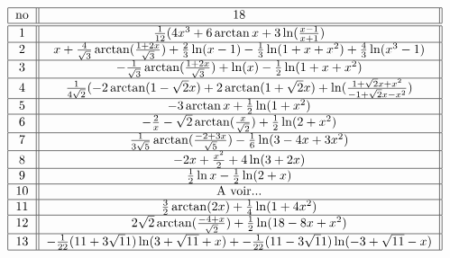  
\[ \begin{tabular}{| c || c ||  }
\hline       no &         ${ 18}                                          $                                                                                                               \\    \hline \hline
             $1$   & $\frac{1}{12}(4x^3+6\arctan x +3\ln(\frac{x-1}{x+1})      $            \\ \hline 
            $2$   &  $ x+\frac{4}{\sqrt 3}\arctan(\frac{1+2x}{\sqrt 3})+ \frac{2}{3}\ln(x-1)- \frac{1}{3}\ln(1+x+x^2) +\frac{4}{3}\ln(x^3-1)$                 \\ \hline

           $3$   &      $  - \frac{1}{\sqrt 3}\arctan(\frac{1+2x}{\sqrt 3})     +\ln(x)- \frac{1}{2}\ln(1+x+x^2)       $ 						\\ \hline 
           $4$   &      $   \frac{1}{4\sqrt 2}(-2\arctan(1-\sqrt2x)+2\arctan(1+\sqrt2x)+\ln(\frac{1+\sqrt2x+x^2}{-1+\sqrt2x-x^2})             $                                                 				\\ \hline 
              $5$   &      $   -3\arctan x+\frac{1}{2}\ln(1+x^2)$   				 \\ \hline
               $6$  &      $-\frac{2}{x}-\sqrt2\arctan(\frac{x}{\sqrt2})+\frac{1}{2}\ln(2+x^2)$                       \\ \hline
              $7$ &      $\frac{1}{3\sqrt5}\arctan(\frac{-2+3x}{\sqrt5}) -\frac{1}{6}\ln(3-4x+3x^2) $                        \\ \hline
               $8$ &     $-2x+\frac{x^2}{2}+4\ln(3+2x)$  			                                                                                \\ \hline
              $9$     &     $\frac{1}{2}\ln x -\frac{1}{2}\ln(2+x)$  			                                                                       \\ \hline
               $10$  &  A voir...     			                                                               \\ \hline
              $11$  &  $\frac{3}{2}\arctan(2x)+\frac{1}{4}\ln(1+4x^2)$			                                                               \\ \hline   
               $12$ &  $2\sqrt2\arctan(\frac{-4+x}{\sqrt2})+\frac{1}{2}\ln(18-8x+x^2)$			                                                               \\ \hline   
              $13$  &  $-\frac{1}{22}(11+3\sqrt11)\ln(3+\sqrt{11}+x)+-\frac{1}{22}(11-3\sqrt11)\ln(-3+\sqrt{11}-x)$			                                                               \\ \hline   

\end{tabular}\]
